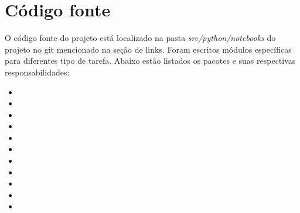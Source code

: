 \section{Código fonte}

O código fonte do projeto está localizado na pasta \textit{src/python/notebooks} do projeto no git mencionado na seção de links. Foram escritos módulos
específicas para diferentes tipo de tarefa. Abaixo estão listados os pacotes e suas respectivas responsabilidades:

\begin{itemize}
    \item {}
    \item {}
    \item {}
    \item {}
    \item {}
    \item {}
    \item {}
    \item {}
    \item {}
    \item {}
    \item {}
\end{itemize}
